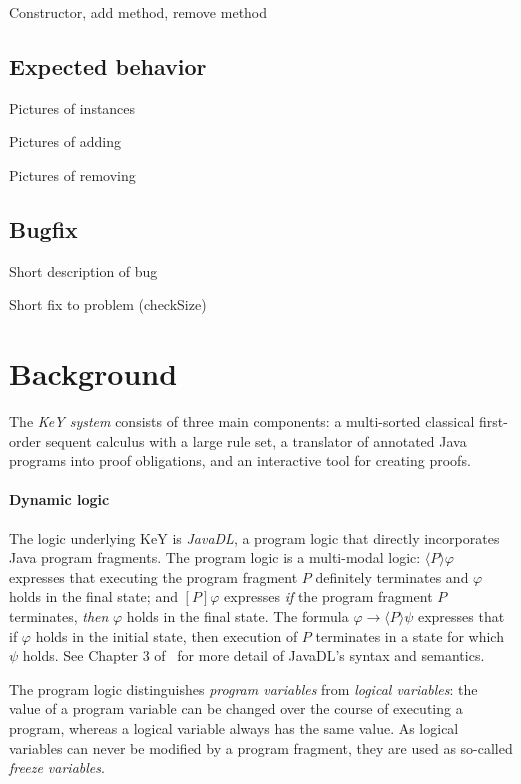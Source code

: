 \documentclass[runningheads]{llncs}
\begin{document}



Constructor, add method, remove method

\subsection{Expected behavior}
Pictures of instances

Pictures of adding

Pictures of removing

\subsection{Bugfix}
Short description of bug

Short fix to problem (checkSize)

\section{Background}\label{sec:background}

The \emph{KeY system} consists of three main components: a multi-sorted classical first-order sequent calculus with a large rule set, a translator of annotated Java programs into proof obligations, and an interactive tool for creating proofs.

\paragraph{Dynamic logic}
The logic underlying KeY is \emph{JavaDL}, a program logic that directly incorporates Java program fragments.
The program logic is a multi-modal logic: $\langle P\rangle\varphi$ expresses that executing the program fragment $P$ definitely terminates and $\varphi$ holds in the final state; and $[P]\varphi$ expresses \emph{if} the program fragment $P$ terminates, \emph{then} $\varphi$ holds in the final state. The formula $\varphi\to\langle P\rangle\psi$ expresses that if $\varphi$ holds in the initial state, then execution of $P$ terminates in a state for which $\psi$ holds.  See Chapter 3 of~\cite{ahrendt2016deductive} for more detail of JavaDL's syntax and semantics.

The program logic distinguishes \emph{program variables} from \emph{logical variables}: the value of a program variable can be changed over the course of executing a program, whereas a logical variable always has the same value. As logical variables can never be modified by a program fragment, they are used as so-called \emph{freeze variables}.
\end{document}
